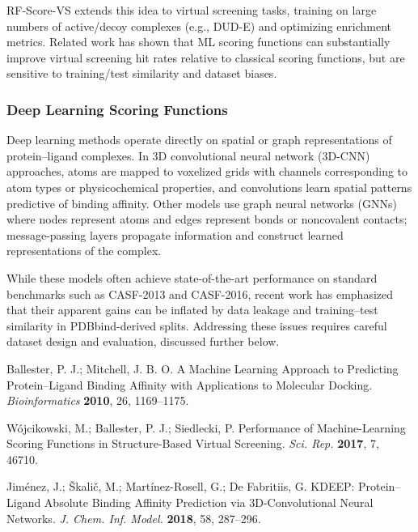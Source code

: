 RF-Score-VS extends this idea to virtual screening tasks, training on large numbers of active/decoy complexes (e.g., DUD-E) and optimizing enrichment metrics.\cite{CH3_Wojcikowski2017_RFScoreVS} Related work has shown that ML scoring functions can substantially improve virtual screening hit rates relative to classical scoring functions, but are sensitive to training/test similarity and dataset biases.\cite{CH3_Su2021_ML_Dissimilar,CH3_Su2017_StructSeqImpact}

\subsubsection{Deep Learning Scoring Functions}

Deep learning methods operate directly on spatial or graph representations of protein--ligand complexes. In 3D convolutional neural network (3D-CNN) approaches, atoms are mapped to voxelized grids with channels corresponding to atom types or physicochemical properties, and convolutions learn spatial patterns predictive of binding affinity.\cite{CH3_Jimenez2018_KDEEP} Other models use graph neural networks (GNNs) where nodes represent atoms and edges represent bonds or noncovalent contacts; message-passing layers propagate information and construct learned representations of the complex.\cite{CH3_Wang2017}

While these models often achieve state-of-the-art performance on standard benchmarks such as CASF-2013 and CASF-2016, recent work has emphasized that their apparent gains can be inflated by data leakage and training--test similarity in PDBbind-derived splits.\cite{Su2021_ML_Dissimilar,Su2017_StructSeqImpact} Addressing these issues requires careful dataset design and evaluation, discussed further below.



Ballester, P. J.; Mitchell, J. B. O. A Machine Learning Approach to Predicting Protein–Ligand Binding Affinity with Applications to Molecular Docking. \textit{Bioinformatics} \textbf{2010}, 26, 1169--1175. %

Wójcikowski, M.; Ballester, P. J.; Siedlecki, P. Performance of Machine-Learning Scoring Functions in Structure-Based Virtual Screening. \textit{Sci. Rep.} \textbf{2017}, 7, 46710. %

Jiménez, J.; Škalič, M.; Martínez-Rosell, G.; De Fabritiis, G. KDEEP: Protein–Ligand Absolute Binding Affinity Prediction via 3D-Convolutional Neural Networks. \textit{J. Chem. Inf. Model.} \textbf{2018}, 58, 287--296. %

